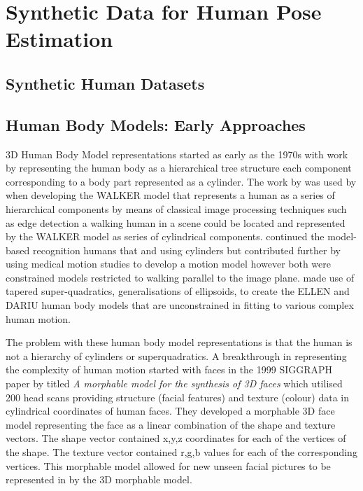 \section{Synthetic Data for Human Pose Estimation}

\subsection{Synthetic Human Datasets}

\cite{varol2017learning}
\cite{patel2021agora}
\cite{yang2023synbody}
\cite{black2023bedlam}
\cite{tesch2025bedlam2}

\subsection{Human Body Models: Early Approaches}

3D Human Body Model representations started as early as the 1970s with work by \citet{marr1978representation} representing the human body as a hierarchical tree structure each component corresponding to a body part represented as a cylinder. The work by \cite{marr1978representation} was used by \citet{hogg1983model} when developing the WALKER model that represents a human as a series of hierarchical components by means of classical image processing techniques such as edge detection a walking human in a scene could be located and represented by the WALKER model as series of cylindrical components. \citet{rohr1994towards} continued the model-based recognition humans that \cite{marr1978representation} and \citet{hogg1983model}  using cylinders but contributed further by using medical motion studies to develop a motion model however both were constrained models restricted to walking parallel to the image plane.
\citet{gavrila19963} made use of tapered super-quadratics, generalisations of ellipsoids, to create the ELLEN and DARIU human body models that are unconstrained in fitting to various complex human motion. 

The problem with these human body model representations is that the human is not a hierarchy of cylinders or superquadratics. 
A breakthrough in representing the complexity of human motion started with faces in the 1999 SIGGRAPH paper by \citet{blanz2023morphable} titled \textit{A morphable model for the synthesis of 3D faces} which utilised 200 head scans providing structure (facial features) and texture (colour) data in cylindrical coordinates of human faces. They developed a morphable 3D face model representing the face as a linear combination of the shape and texture vectors. The shape vector contained x,y,z coordinates for each of the vertices of the shape. The texture vector contained r,g,b values for each of the corresponding vertices. This morphable model allowed for new unseen facial pictures to be represented in by the 3D morphable model.



